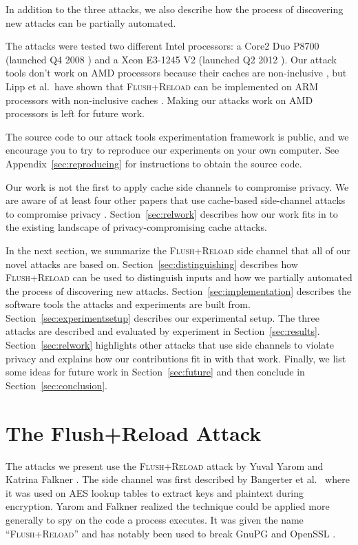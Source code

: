 \documentclass[letterpaper,twocolumn,10pt]{article}
\begin{document}
In addition to the three attacks, we also describe how the process of
discovering new attacks can be partially automated.

The attacks were tested two different Intel processors: a Core2 Duo P8700
(launched Q4 2008 \cite{intelp8700page}) and a Xeon E3-1245 V2 (launched Q2 2012
\cite{intele31245page}). Our attack tools don't work on AMD processors because
their caches are non-inclusive \cite{yarom2013flush}, but Lipp et al.\ have
shown that \textsc{Flush+Reload} can be implemented on ARM processors with
non-inclusive caches \cite{lipp2015armageddon}. Making our attacks work on AMD
processors is left for future work.

The source code to our attack tools experimentation framework is public, and we
encourage you to try to reproduce our experiments on your own computer. See
Appendix~\ref{sec:reproducing} for instructions to obtain the source code.

Our work is not the first to apply cache side channels to compromise privacy. We
are aware of at least four other papers that use cache-based side-channel
attacks to compromise privacy \cite{gruss2015cache, zhang2014cross, oren2015spy,
lipp2015armageddon}. Section~\ref{sec:relwork} describes how our work fits in to
the existing landscape of privacy-compromising cache attacks.

In the next section, we summarize the \textsc{Flush+Reload} side channel that
all of our novel attacks are based on. Section~\ref{sec:distinguishing}
describes how \textsc{Flush+Reload} can be used to distinguish inputs and how we
partially automated the process of discovering new attacks.
Section~\ref{sec:implementation} describes the software tools the attacks and
experiments are built from. Section~\ref{sec:experimentsetup} describes our
experimental setup. The three attacks are described and evaluated by experiment
in Section~\ref{sec:results}. Section~\ref{sec:relwork} highlights other attacks
that use side channels to violate privacy and explains how our contributions fit
in with that work. Finally, we list some ideas for future work in
Section~\ref{sec:future} and then conclude in Section~\ref{sec:conclusion}.

\section{The Flush+Reload Attack}
\label{sec:flushreload}

The attacks we present use the \textsc{Flush+Reload} attack by Yuval Yarom and
Katrina Falkner \cite{yarom2013flush}. The side channel was first described by
Bangerter et al.\ \cite{gullasch2011cache} where it was used on AES lookup
tables to extract keys and plaintext during encryption. Yarom and Falkner
realized the technique could be applied more generally to spy on the code
a process executes. It was given the name ``\textsc{Flush+Reload}'' and has
notably been used to break GnuPG \cite{yarom2013flush} and OpenSSL
\cite{benger2014ooh, yarom2014recovering}.
\end{document}
